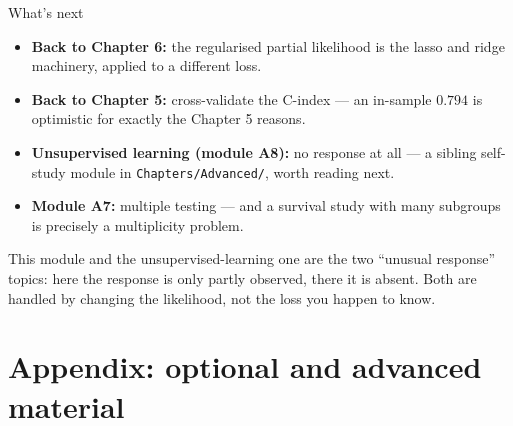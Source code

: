 \documentclass[aspectratio=169,11pt]{beamer}
\begin{document}
\begin{frame}{What's next}
  \footnotesize
  \begin{readme}
    \begin{itemize}
      \item \textbf{Back to Chapter 6:} the regularised partial likelihood is the lasso
            and ridge machinery, applied to a different loss.
      \item \textbf{Back to Chapter 5:} cross-validate the C-index --- an in-sample
            $0.794$ is optimistic for exactly the Chapter 5 reasons.
      \item \textbf{Unsupervised learning (module A8):} no response at all --- a sibling
            self-study module in \texttt{Chapters/Advanced/}, worth reading next.
      \item \textbf{Module A7:} multiple testing --- and a survival study with many
            subgroups is precisely a multiplicity problem.
    \end{itemize}
  \end{readme}
  \begin{takeaway}
    This module and the unsupervised-learning one are the two ``unusual response''
    topics: here the response is only partly observed, there it is absent. Both are
    handled by changing the likelihood, not the loss you happen to know.
  \end{takeaway}
\end{frame}

\appendix
\AtBeginSection[]{}
\section{Appendix: optional and advanced material}
\end{document}
